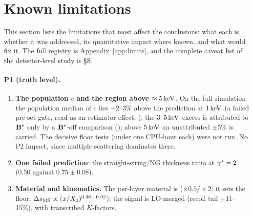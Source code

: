 \section{Known limitations}\label{sec:limits}

This section lists the limitations that most affect the conclusions: what each is, whether it was addressed, its
quantitative impact where known, and what would fix it. The full registry is Appendix~\ref{app:limits}, and the complete
caveat list of the detector-level study is  \S8.

\paragraph{P1 (truth level).}
\begin{enumerate}
\item \textbf{The population $c$ and the region above $\approx5\,\mathrm{keV}$.} On the full simulation the population median of $c$
  lies $+2$--$3\%$ above the prediction at $1\,\mathrm{keV}$ (a failed pre-set gate, read as an estimator effect, \EST{}); the
  $3$--$5\,\mathrm{keV}$ excess is attributed to $\mathbf{B}^*$ only by a $\mathbf{B}^*$-off comparison (\EST{}); above $5\,\mathrm{keV}$ an unattributed
  $\pm5\%$ is carried. The decisive floor tests (under one CPU-hour each) were not run. No P2 impact, since multiple
  scattering dominates there.
\item \textbf{One failed prediction}: the straight-string/NG thickness ratio at $\gamma^*=2$ (0.50 against $0.75\pm0.08$).
\item \textbf{Material and kinematics.} The per-layer material is \UNV{} ($\times0.5/\times2$; it sets the floor,
  $\Delta s_{\rm MS}\propto(x/X_0)^{0.36\ldots0.62}$); the signal is LO-merged (recoil tail $\pm11$--15\%), with transcribed $K$-factors.
\end{enumerate}

